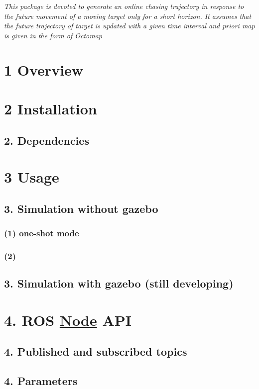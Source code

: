 

{\itshape This package is devoted to generate an online chasing trajectory in response to the future movement of a moving target only for a short horizon. It assumes that the future trajectory of target is updated with a given time interval and priori map is given in the form of Octomap}

\section*{1 Overview}



\section*{2 Installation}

\subsection*{2. Dependencies}

\section*{3 Usage}

\subsection*{3. Simulation without gazebo}

\subsubsection*{(1) one-\/shot mode}

\subsubsection*{(2)}

\subsection*{3. Simulation with gazebo (still developing)}

\section*{4. R\+OS \hyperlink{struct_node}{Node} A\+PI}

\subsection*{4. Published and subscribed topics}

\subsection*{4. Parameters}
